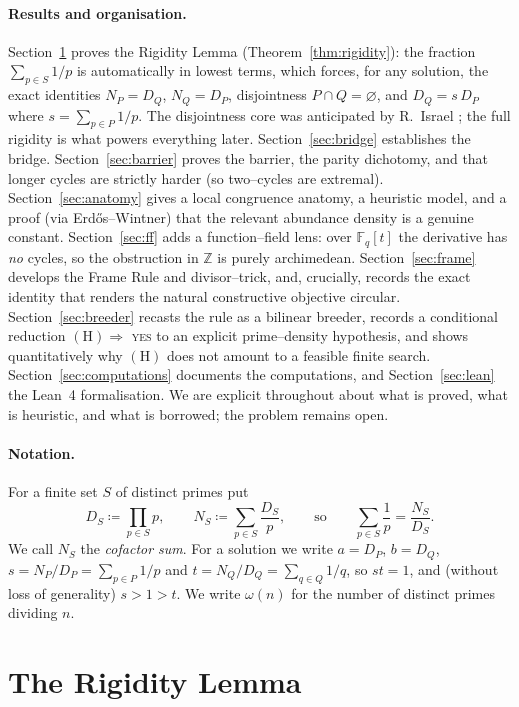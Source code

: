 \documentclass[11pt]{article}
\theoremstyle{definition}
\begin{document}
\paragraph{Results and organisation.}
Section~\ref{sec:rigidity} proves the Rigidity Lemma (Theorem~\ref{thm:rigidity}): the fraction
$\sum_{p\in S}1/p$ is automatically in lowest terms, which forces, for any solution, the exact
identities $N_P=D_Q$, $N_Q=D_P$, disjointness $P\cap Q=\varnothing$, and $D_Q=s\,D_P$ where
$s=\sum_{p\in P}1/p$. The disjointness core was anticipated by R.~Israel \cite{MO320838}; the full
rigidity is what powers everything later. Section~\ref{sec:bridge} establishes the bridge.
Section~\ref{sec:barrier} proves the barrier, the parity dichotomy, and that longer cycles are
strictly harder (so two--cycles are extremal). Section~\ref{sec:anatomy} gives a local congruence
anatomy, a heuristic model, and a proof (via Erd\H{o}s--Wintner) that the relevant abundance density
is a genuine constant. Section~\ref{sec:ff} adds a function--field lens: over $\mathbb{F}_q[t]$ the
derivative has \emph{no} cycles, so the obstruction in $\mathbb{Z}$ is purely archimedean.
Section~\ref{sec:frame} develops the Frame Rule and divisor--trick,
and, crucially, records the exact identity that renders the natural constructive objective
circular. Section~\ref{sec:breeder} recasts the rule as a bilinear breeder, records a conditional
reduction $(\mathrm{H})\Rightarrow$ \textsc{yes} to an explicit prime--density hypothesis, and shows
quantitatively why $(\mathrm{H})$ does not amount to a feasible finite search.
Section~\ref{sec:computations} documents the computations, and Section~\ref{sec:lean} the
Lean~4 formalisation. We are explicit throughout about what is proved, what is heuristic, and what
is borrowed; the problem remains open.

\paragraph{Notation.}
For a finite set $S$ of distinct primes put
\[
D_S \coloneqq \prod_{p\in S} p, \qquad N_S \coloneqq \sum_{p\in S} \frac{D_S}{p},
\qquad\text{so}\qquad \sum_{p\in S}\frac1p = \frac{N_S}{D_S}.
\]
We call $N_S$ the \emph{cofactor sum}. For a solution we write $a=D_P$, $b=D_Q$,
$s=N_P/D_P=\sum_{p\in P}1/p$ and $t=N_Q/D_Q=\sum_{q\in Q}1/q$, so $st=1$, and (without loss of
generality) $s>1>t$. We write $\omega(n)$ for the number of distinct primes dividing $n$.

\section{The Rigidity Lemma}\label{sec:rigidity}
\end{document}
